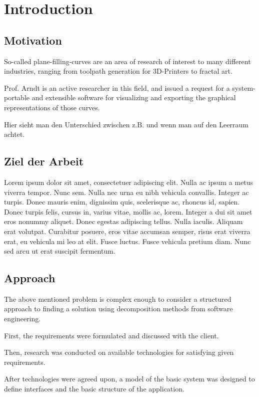 \chapter{Introduction}
\label{cha:Intro}

\section{Motivation}

So-called plane-filling-curves are an area of research of interest to many different industries, ranging from toolpath generation for 3D-Printers to fractal art.

Prof. Arndt is an active researcher in this field, and issued a request for a system-portable and extensible software for visualizing and exporting the graphical representations of those curves.

Hier sieht man den Unterschied zwischen z.B. und \zB wenn man auf den Leerraum achtet.

\section{Ziel der Arbeit}
Lorem ipsum dolor sit amet, consectetuer adipiscing elit. Nulla ac ipsum a metus viverra tempor. Nunc sem. Nulla nec urna eu nibh vehicula convallis. Integer ac turpis. Donec mauris enim, dignissim quis, scelerisque ac, rhoncus id, sapien. Donec turpis felis, cursus in, varius vitae, mollis ac, lorem. Integer a dui sit amet eros nonummy aliquet. Donec egestas adipiscing tellus. Nulla iaculis. Aliquam erat volutpat. Curabitur posuere, eros vitae accumsan semper, risus erat viverra erat, eu vehicula mi leo at elit. Fusce luctus. Fusce vehicula pretium diam. Nunc sed arcu ut erat suscipit fermentum.


\section{Approach}
The above mentioned problem is complex enough to consider a structured approach to finding a solution using decomposition methods from software engineering.

First, the requirements were formulated and discussed with the client.

Then, research was conducted on available technologies for satisfying given requirements.

After technologies were agreed upon, a  model of the basic system was designed to define interfaces and the basic structure of the application.

